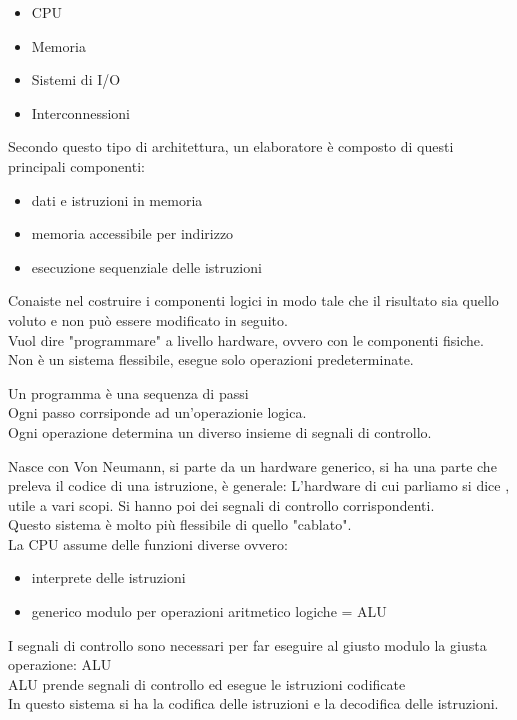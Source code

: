 \documentclass[12pt, a4paper]{article}
\begin{document}
\begin{itemize}
	\item CPU
	\item Memoria
	\item Sistemi di I/O
	\item Interconnessioni
\end{itemize}

\begin{defn}
Secondo questo tipo di architettura, un elaboratore è composto di questi
principali componenti:
\begin{itemize}
	\item dati e istruzioni in memoria
	\item memoria accessibile per indirizzo
	\item esecuzione sequenziale delle istruzioni
\end{itemize}
\end{defn}

\begin{defn}
	Conaiste nel costruire i componenti logici in modo tale che il risultato 
	sia quello voluto e non può essere modificato in seguito.\\
	Vuol dire "programmare" a livello hardware, ovvero con le 
	componenti fisiche.\\
	Non è un sistema flessibile, esegue solo operazioni predeterminate.
\end{defn}

\begin{defn}[Programma]
	Un programma è una sequenza di passi\\
	Ogni passo corrsiponde ad un'operazionie logica.\\
	Ogni operazione determina un diverso insieme di segnali di controllo.\\
\end{defn}

\begin{defn}
	Nasce con Von Neumann, si parte da un hardware generico, 
	si ha una parte che preleva il codice di una istruzione, è generale:
	L'hardware di cui parliamo si dice , utile a vari scopi.
	Si hanno poi dei segnali di controllo corrispondenti.\\
	Questo sistema è molto più flessibile di quello "cablato".\\
	La CPU assume delle funzioni diverse ovvero:
	
	\begin{itemize}
	\item interprete delle istruzioni
	\item generico modulo per operazioni aritmetico logiche = ALU
	\end{itemize}
	I segnali di controllo sono necessari per far eseguire 
	al giusto modulo la giusta operazione: ALU\\
	ALU prende segnali di controllo ed esegue le istruzioni codificate\\
	In questo sistema si ha la codifica 
	delle istruzioni e la decodifica delle istruzioni.

\end{defn}
\end{document}
